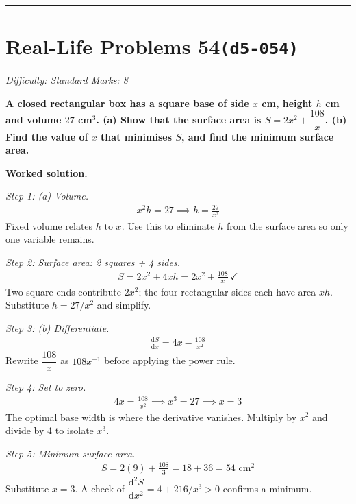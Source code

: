 \documentclass[11pt]{article}
\newcommand{\question}[1]{\par\medskip\noindent\textbf{#1}\par}
\begin{document}
\medskip\hrule

\section*{Real-Life Problems 54\quad\small\texttt{(d5-054)}}
\textit{Difficulty: Standard \quad\textbar\quad Marks: 8}

\question{A closed rectangular box has a square base of side \( x \) cm, height \( h \) cm and volume \( 27 \) cm\(^3\). (a) Show that the surface area is \( S = 2x^2 + \dfrac{108}{x} \). (b) Find the value of \( x \) that minimises \( S \), and find the minimum surface area.}

\textbf{Worked solution.}

\textit{Step 1: (a) Volume.}
\[\begin{gathered}
x^2 h = 27 \implies h = \frac{27}{x^2}
\end{gathered}\]
Fixed volume relates \( h \) to \( x \). Use this to eliminate \( h \) from the surface area so only one variable remains.

\textit{Step 2: Surface area: 2 squares + 4 sides.}
\[\begin{gathered}
S = 2x^2 + 4xh = 2x^2 + \frac{108}{x} \, \checkmark
\end{gathered}\]
Two square ends contribute \( 2x^2 \); the four rectangular sides each have area \( xh \). Substitute \( h = 27/x^2 \) and simplify.

\textit{Step 3: (b) Differentiate.}
\[\begin{gathered}
\frac{\mathrm{d}S}{\mathrm{d}x} = 4x - \frac{108}{x^2}
\end{gathered}\]
Rewrite \( \dfrac{108}{x} \) as \( 108x^{-1} \) before applying the power rule.

\textit{Step 4: Set to zero.}
\[\begin{gathered}
4x = \frac{108}{x^2} \implies x^3 = 27 \implies x = 3
\end{gathered}\]
The optimal base width is where the derivative vanishes. Multiply by \( x^2 \) and divide by 4 to isolate \( x^3 \).

\textit{Step 5: Minimum surface area.}
\[\begin{gathered}
S = 2(9) + \frac{108}{3} = 18 + 36 = 54 \text{ cm}^2
\end{gathered}\]
Substitute \( x = 3 \). A check of \( \dfrac{\mathrm{d}^2 S}{\mathrm{d}x^2} = 4 + 216/x^3 > 0 \) confirms a minimum.
\end{document}
